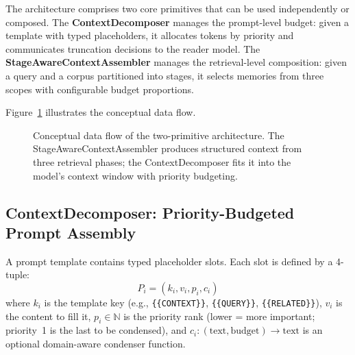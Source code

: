 \documentclass[11pt]{article}
\newcommand{\eg}{e.g.}
\begin{document}
The architecture comprises two core primitives that can be used
independently or composed.  The \textbf{ContextDecomposer} manages
the prompt-level budget: given a template with typed placeholders, it
allocates tokens by priority and communicates truncation decisions to
the reader model.  The \textbf{StageAwareContextAssembler} manages
the retrieval-level composition: given a query and a corpus
partitioned into stages, it selects memories from three scopes with
configurable budget proportions.

Figure~\ref{fig:dataflow} illustrates the conceptual data flow.

\begin{figure}[t]
\centering
{}
\caption{Conceptual data flow of the two-primitive architecture.  The
StageAwareContextAssembler produces structured context from three
retrieval phases; the ContextDecomposer fits it into the model's
context window with priority budgeting.}
\label{fig:dataflow}
\end{figure}

\subsection{ContextDecomposer: Priority-Budgeted Prompt Assembly}
\label{sec:decomposer}

A prompt template contains typed placeholder slots.  Each slot is
defined by a 4-tuple:
\begin{equation}
P_i = (k_i, v_i, p_i, c_i)
\label{eq:placeholder}
\end{equation}
where $k_i$ is the template key (\eg, \texttt{\{\{CONTEXT\}\}},
\texttt{\{\{QUERY\}\}}, \texttt{\{\{RELATED\}\}}), $v_i$ is the
content to fill it, $p_i \in \mathbb{N}$ is the priority rank
(lower = more important; priority~1 is the last to be condensed),
and $c_i: (\text{text}, \text{budget}) \to \text{text}$ is an
optional domain-aware condenser function.
\end{document}
